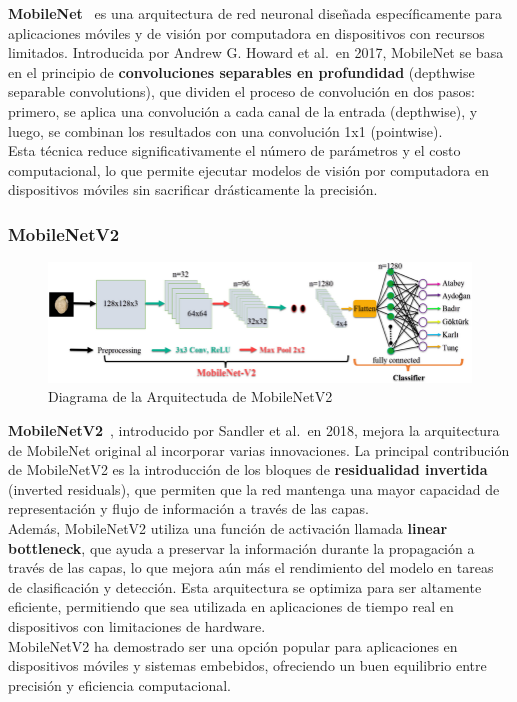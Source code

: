\textbf{MobileNet}~\cite{howard_mobilenets_2017} es una arquitectura de red neuronal diseñada específicamente para
aplicaciones móviles y de visión por computadora en dispositivos con recursos limitados.
Introducida por Andrew G. Howard et al.\ en 2017, MobileNet se basa en el principio de
\textbf{convoluciones separables en profundidad} (depthwise separable convolutions), que dividen el proceso de
convolución en dos pasos: primero, se aplica una convolución a cada canal de la entrada (depthwise), y luego, se
combinan los resultados con una convolución 1x1 (pointwise). \\[6pt]

Esta técnica reduce significativamente el número de parámetros y el costo computacional, lo que permite ejecutar
modelos de visión por computadora en dispositivos móviles sin sacrificar drásticamente la precisión.

\subsubsection{MobileNetV2}\label{subsubsec:mobilenetv2}

\begin{figure}[htp] \label{fig:mobilenetv2}
    \begin{center}
        \includegraphics[width=1\textwidth]{imagenes/mobilenetv2}
    \end{center}
    \caption[MobileNetV2]{Diagrama de la Arquitectuda de MobileNetV2}
\end{figure}

\textbf{MobileNetV2}~\cite{sandler_mobilenetv2_2019}, introducido por Sandler et al.\ en 2018, mejora la arquitectura
de MobileNet original al incorporar varias innovaciones.
La principal contribución de MobileNetV2 es la introducción de los bloques de \textbf{residualidad invertida} (inverted
residuals), que permiten que la red mantenga una mayor capacidad de representación y flujo de información a través de
las capas. \\[6pt]

Además, MobileNetV2 utiliza una función de activación llamada \textbf{linear bottleneck}, que ayuda a preservar la
información durante la propagación a través de las capas, lo que mejora aún más el rendimiento del modelo en tareas de
clasificación y detección.
Esta arquitectura se optimiza para ser altamente eficiente, permitiendo que sea utilizada en aplicaciones de tiempo
real en dispositivos con limitaciones de hardware. \\[6pt]

MobileNetV2 ha demostrado ser una opción popular para aplicaciones en dispositivos móviles y sistemas embebidos,
ofreciendo un buen equilibrio entre precisión y eficiencia computacional.
